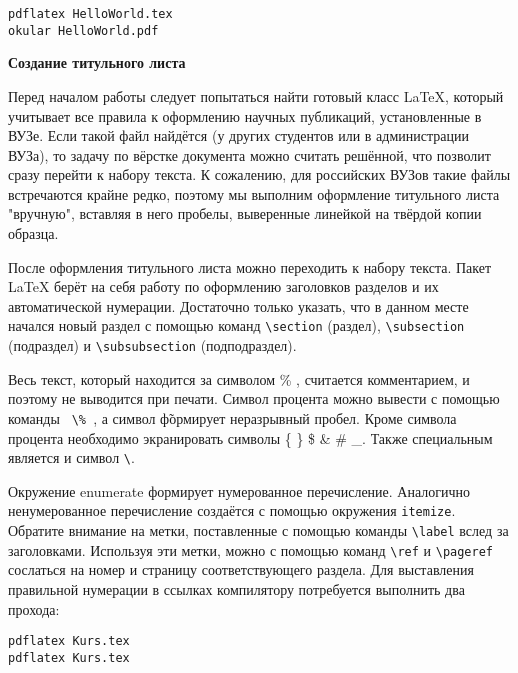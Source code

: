 \begin{verbatim}
pdflatex HelloWorld.tex
okular HelloWorld.pdf
\end{verbatim}

\textbf{Создание титульного листа}

Перед началом работы следует попытаться найти готовый класс LaTeX, который учитывает все правила к оформлению научных публикаций, установленные в ВУЗе. Если такой файл найдётся (у других студентов или в администрации ВУЗа), то задачу по вёрстке документа можно считать решённой, что позволит сразу перейти к набору текста.
К сожалению, для российских ВУЗов такие файлы встречаются крайне редко, поэтому мы выполним оформление титульного листа "вручную", вставляя в него пробелы, выверенные линейкой на твёрдой копии образца.

После оформления титульного листа можно переходить к набору текста. Пакет LaTeX берёт на себя работу по оформлению заголовков разделов и их автоматической нумерации. Достаточно только указать, что в данном месте начался новый раздел с помощью команд \verb|\section| (раздел), \verb|\subsection| (подраздел) и \verb|\subsubsection| (подподраздел).

Весь текст, который находится за символом  \% , считается комментарием, и поэтому не выводится при печати. Символ процента можно вывести с помощью команды \verb| \% |, а символ  \~  формирует неразрывный пробел.
Кроме символа процента необходимо экранировать символы \{ \} \$ \& \# \_. Также специальным является и символ \verb|\|.

Окружение enumerate формирует нумерованное перечисление. Аналогично ненумерованное перечисление создаётся с помощью окружения \verb|itemize|.
Обратите внимание на метки, поставленные с помощью команды \verb|\label| вслед за заголовками. Используя эти метки, можно с помощью команд \verb|\ref| и \verb|\pageref| сослаться на номер и страницу соответствующего раздела. Для выставления правильной нумерации в ссылках компилятору потребуется выполнить два прохода:

\begin{verbatim}
pdflatex Kurs.tex
pdflatex Kurs.tex
\end{verbatim}

